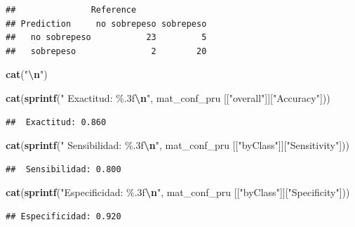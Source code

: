 \documentclass[
]{article}
\newenvironment{Shaded}{\begin{snugshade}}{\end{snugshade}}
\newcommand{\FunctionTok}[1]{\textcolor[rgb]{0.13,0.29,0.53}{\textbf{#1}}}
\newcommand{\NormalTok}[1]{#1}
\newcommand{\SpecialCharTok}[1]{\textcolor[rgb]{0.81,0.36,0.00}{\textbf{#1}}}
\newcommand{\StringTok}[1]{\textcolor[rgb]{0.31,0.60,0.02}{#1}}
\begin{document}
\begin{verbatim}
##               Reference
## Prediction     no sobrepeso sobrepeso
##   no sobrepeso           23         5
##   sobrepeso               2        20
\end{verbatim}

\begin{Shaded}
\begin{Highlighting}[]
\FunctionTok{cat}\NormalTok{(}\StringTok{"}\SpecialCharTok{\textbackslash{}n}\StringTok{"}\NormalTok{)}
\end{Highlighting}
\end{Shaded}

\begin{Shaded}
\begin{Highlighting}[]
\FunctionTok{cat}\NormalTok{(}\FunctionTok{sprintf}\NormalTok{(}\StringTok{" Exactitud: \%.3f}\SpecialCharTok{\textbackslash{}n}\StringTok{"}\NormalTok{, mat\_conf\_pru [[}\StringTok{"overall"}\NormalTok{]][}\StringTok{"Accuracy"}\NormalTok{])) }
\end{Highlighting}
\end{Shaded}

\begin{verbatim}
##  Exactitud: 0.860
\end{verbatim}

\begin{Shaded}
\begin{Highlighting}[]
\FunctionTok{cat}\NormalTok{(}\FunctionTok{sprintf}\NormalTok{(}\StringTok{" Sensibilidad: \%.3f}\SpecialCharTok{\textbackslash{}n}\StringTok{"}\NormalTok{, mat\_conf\_pru [[}\StringTok{"byClass"}\NormalTok{]][}\StringTok{"Sensitivity"}\NormalTok{]))}
\end{Highlighting}
\end{Shaded}

\begin{verbatim}
##  Sensibilidad: 0.800
\end{verbatim}

\begin{Shaded}
\begin{Highlighting}[]
\FunctionTok{cat}\NormalTok{(}\FunctionTok{sprintf}\NormalTok{(}\StringTok{"Especificidad: \%.3f}\SpecialCharTok{\textbackslash{}n}\StringTok{"}\NormalTok{, mat\_conf\_pru [[}\StringTok{"byClass"}\NormalTok{]][}\StringTok{"Specificity"}\NormalTok{]))}
\end{Highlighting}
\end{Shaded}

\begin{verbatim}
## Especificidad: 0.920
\end{verbatim}
\end{document}
